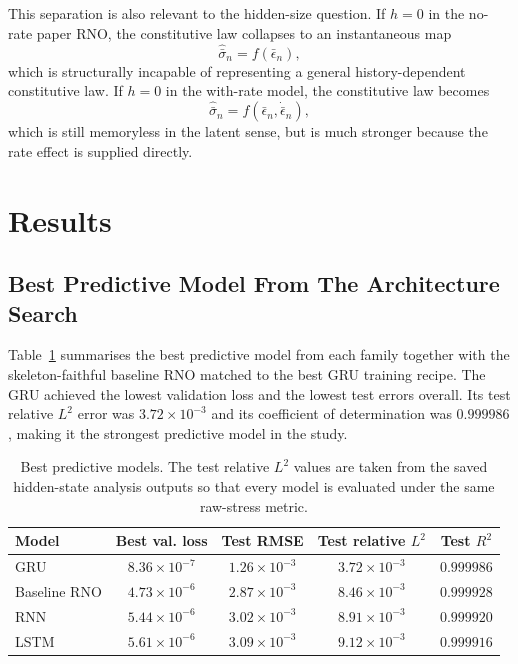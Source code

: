 \documentclass[11pt,a4paper]{article}
\newcommand{\epsbar}{\bar{\epsilon}}
\newcommand{\sigbar}{\bar{\sigma}}
\begin{document}
This separation is also relevant to the hidden-size question. If $h=0$ in the no-rate paper RNO, the constitutive law collapses to an instantaneous map
\begin{equation}
\hat{\sigbar}_n=f\!\left(\epsbar_n\right),
\label{eq:h0_no_rate}
\end{equation}
which is structurally incapable of representing a general history-dependent constitutive law. If $h=0$ in the with-rate model, the constitutive law becomes
\begin{equation}
\hat{\sigbar}_n=f\!\left(\epsbar_n,\dot{\epsbar}_n\right),
\label{eq:h0_with_rate}
\end{equation}
which is still memoryless in the latent sense, but is much stronger because the rate effect is supplied directly.

\FloatBarrier
\section{Results}

\subsection{Best Predictive Model From The Architecture Search}

Table~\ref{tab:model_comparison} summarises the best predictive model from each family together with the skeleton-faithful baseline RNO matched to the best GRU training recipe. The GRU achieved the lowest validation loss and the lowest test errors overall. Its test relative $L^2$ error was $3.72\times 10^{-3}$ and its coefficient of determination was $0.999986$, making it the strongest predictive model in the study.

\begin{table}[t]
\centering
\caption{Best predictive models. The test relative $L^2$ values are taken from the saved hidden-state analysis outputs so that every model is evaluated under the same raw-stress metric.}
\label{tab:model_comparison}
\begin{tabular}{lcccc}
\toprule
Model & Best val. loss & Test RMSE & Test relative $L^2$ & Test $R^2$ \\
\midrule
GRU & $8.36\times 10^{-7}$ & $1.26\times 10^{-3}$ & $3.72\times 10^{-3}$ & $0.999986$ \\
Baseline RNO & $4.73\times 10^{-6}$ & $2.87\times 10^{-3}$ & $8.46\times 10^{-3}$ & $0.999928$ \\
RNN & $5.44\times 10^{-6}$ & $3.02\times 10^{-3}$ & $8.91\times 10^{-3}$ & $0.999920$ \\
LSTM & $5.61\times 10^{-6}$ & $3.09\times 10^{-3}$ & $9.12\times 10^{-3}$ & $0.999916$ \\
\bottomrule
\end{tabular}
\end{table}
\end{document}
